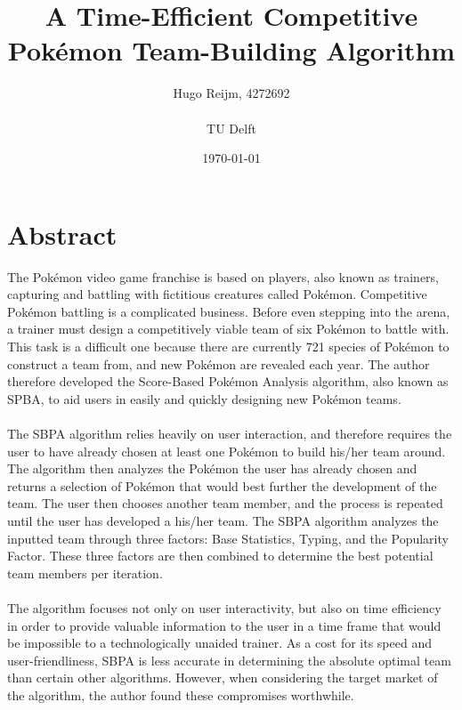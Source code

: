 \documentclass{article}
\title{A Time-Efficient Competitive Pok\'emon Team-Building Algorithm}
\author{Hugo Reijm, 4272692\\\\TU Delft}
\date{\today}
\begin{document}
\maketitle

\newpage
\section*{Abstract}
The Pok\'emon video game franchise is based on players, also known as trainers, capturing and battling with fictitious creatures called Pok\'emon. Competitive Pok\'emon battling is a complicated business. Before even stepping into the arena, a trainer must design a competitively viable team of six Pok\'emon to battle with. This task is a difficult one because there are currently 721 species of Pok\'emon to construct a team from, and new Pok\'emon are revealed each year. The author therefore developed the Score-Based Pok\'emon Analysis algorithm, also known as SPBA, to aid users in easily and quickly designing new Pok\'emon teams.\\\\
The SBPA algorithm relies heavily on user interaction, and therefore requires the user to have already chosen at least one Pok\'emon to build his/her team around. The algorithm then analyzes the Pok\'emon the user has already chosen and returns a selection of Pok\'emon that would best further the development of the team. The user then chooses another team member, and the process is repeated until the user has developed a his/her team. The SBPA algorithm analyzes the inputted team through three factors: Base Statistics, Typing, and the Popularity Factor. These three factors are then combined to determine the best potential team members per iteration.\\\\
The algorithm focuses not only on user interactivity, but also on time efficiency in order to provide valuable information to the user in a time frame that would be impossible to a technologically unaided trainer. As a cost for its speed and user-friendliness, SBPA is less accurate in determining the absolute optimal team than certain other algorithms. However, when considering the target market of the algorithm, the author found these compromises worthwhile.

\newpage
\tableofcontents

\newpage
\end{document}
